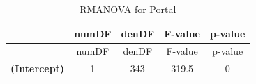 \documentclass[]{article}
\begin{document}
\begin{longtable}[]{@{}ccccc@{}}
\caption{RMANOVA for Portal}\tabularnewline
\toprule
\begin{minipage}[b]{0.25\columnwidth}\centering\strut
~\strut
\end{minipage} & \begin{minipage}[b]{0.10\columnwidth}\centering\strut
numDF\strut
\end{minipage} & \begin{minipage}[b]{0.10\columnwidth}\centering\strut
denDF\strut
\end{minipage} & \begin{minipage}[b]{0.12\columnwidth}\centering\strut
F-value\strut
\end{minipage} & \begin{minipage}[b]{0.12\columnwidth}\centering\strut
p-value\strut
\end{minipage}\tabularnewline
\midrule
\endfirsthead
\toprule
\begin{minipage}[b]{0.25\columnwidth}\centering\strut
~\strut
\end{minipage} & \begin{minipage}[b]{0.10\columnwidth}\centering\strut
numDF\strut
\end{minipage} & \begin{minipage}[b]{0.10\columnwidth}\centering\strut
denDF\strut
\end{minipage} & \begin{minipage}[b]{0.12\columnwidth}\centering\strut
F-value\strut
\end{minipage} & \begin{minipage}[b]{0.12\columnwidth}\centering\strut
p-value\strut
\end{minipage}\tabularnewline
\midrule
\endhead
\begin{minipage}[t]{0.25\columnwidth}\centering\strut
\textbf{(Intercept)}\strut
\end{minipage} & \begin{minipage}[t]{0.10\columnwidth}\centering\strut
1\strut
\end{minipage} & \begin{minipage}[t]{0.10\columnwidth}\centering\strut
343\strut
\end{minipage} & \begin{minipage}[t]{0.12\columnwidth}\centering\strut
319.5\strut
\end{minipage} & \begin{minipage}[t]{0.12\columnwidth}\centering\strut
0\strut
\end{minipage}\tabularnewline

\end{longtable}
\end{document}
